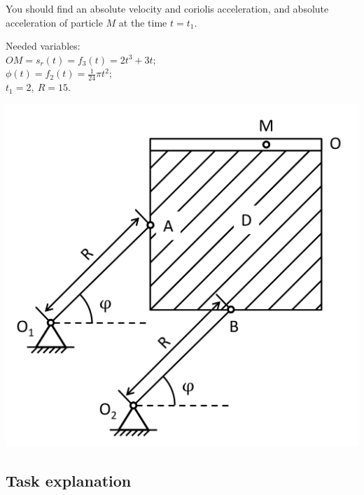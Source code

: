 \documentclass{article}
\begin{document}
\noindent %
\begin{minipage}{0.6\textwidth}
  You should find an absolute velocity and coriolis acceleration, and absolute acceleration of particle $M$ at the time $t=t_1$. 

  Needed variables:\\
  $OM=s_r(t)=f_3(t)=2t^3+3t$;\\
  $\phi(t)=f_2(t)=\frac{1}{24}\pi t^2$;\\
  $t_1=2,\ R=15$.
\end{minipage}%
\hfill %
\begin{minipage}{0.39\textwidth}
  \includegraphics[width=\textwidth]{HW3_1.png} %
\end{minipage}

  
\subsection{Task explanation}
\end{document}
